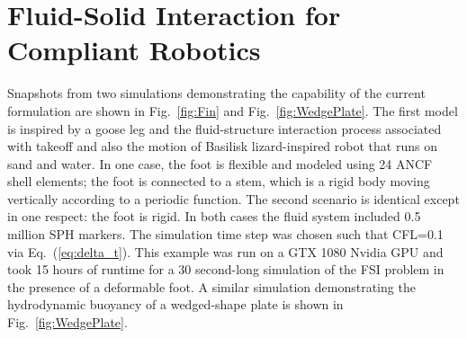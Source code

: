 \section{Fluid-Solid Interaction for Compliant Robotics}
Snapshots from two simulations demonstrating the capability of the current formulation are shown in Fig.~\ref{fig:Fin} and Fig.~\ref{fig:WedgePlate}. The first model is inspired by a goose leg and the fluid-structure interaction process associated with takeoff and also the motion of Basilisk lizard-inspired robot that runs on sand and water.  In one case, the foot is flexible and modeled using 24 ANCF shell elements; the foot is connected to a stem, which is a rigid body moving vertically according to a periodic function. The second scenario is identical except in one respect: the foot is rigid. In both cases the fluid system included 0.5 million SPH markers. The simulation time step was chosen such that CFL=0.1 via Eq.~(\ref{eq:delta_t}). This example was run on a GTX 1080 Nvidia GPU and took 15 hours of runtime for a 30 second-long simulation of the FSI problem in the presence of a deformable foot. A similar simulation demonstrating the hydrodynamic buoyancy of a wedged-shape plate is shown in Fig.~\ref{fig:WedgePlate}. 
